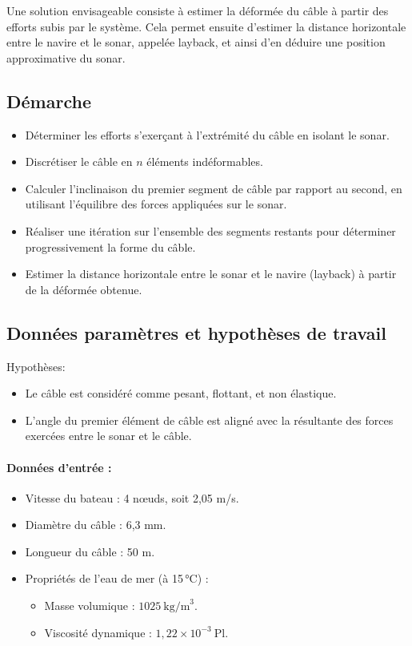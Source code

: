 \documentclass[12pt,a4paper]{report}
\begin{document}
Une solution envisageable consiste à estimer la déformée du câble à partir des efforts subis par le système.
Cela permet ensuite d’estimer la distance horizontale entre le navire et le sonar, appelée layback, et ainsi d’en déduire une position approximative du sonar.

\subsection{Démarche}

\begin{itemize}

 \item Déterminer les efforts s'exerçant à l'extrémité du câble en isolant le sonar.
 \item Discrétiser le câble en $n$ éléments indéformables.
 \item Calculer l'inclinaison du premier segment de câble par rapport au second, en utilisant l'équilibre des forces appliquées sur le sonar.
 \item Réaliser une itération sur l’ensemble des segments restants pour déterminer progressivement la forme du câble.
 \item Estimer la distance horizontale entre le sonar et le navire (layback) à partir de la déformée obtenue.

\end{itemize}

\subsection{Données paramètres et hypothèses de travail}

Hypothèses:
\begin{itemize}
  \item Le câble est considéré comme pesant, flottant, et non élastique.
  \item L’angle du premier élément de câble est aligné avec la résultante des forces exercées entre le sonar et le câble.
\end{itemize}

\paragraph{Données d’entrée :}
\begin{itemize}
  \item Vitesse du bateau : 4 nœuds, soit 2{,}05 m/s.
  \item Diamètre du câble : 6{,}3 mm.
  \item Longueur du câble : 50 m.
  \item Propriétés de l’eau de mer (à 15\,°C) :
  \begin{itemize}
    \item Masse volumique : \( 1025~\text{kg/m}^3 \).
    \item Viscosité dynamique : \( 1{,}22 \times 10^{-3}~\text{Pl} \).
  \end{itemize}
\end{itemize}
\end{document}
